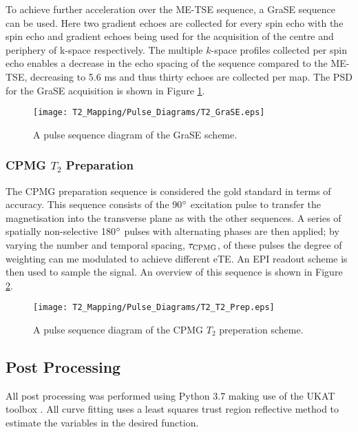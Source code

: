 To achieve further acceleration over the \ac{ME-TSE} sequence, a \ac{GraSE} sequence can be used. Here two gradient echoes are collected for every spin echo with the spin echo and gradient echoes being used for the acquisition of the centre and periphery of k-space respectively. The multiple $k$-space profiles collected per spin echo enables a decrease in the echo spacing of the sequence compared to the \ac{ME-TSE}, decreasing to 5.6 ms and thus thirty echoes are collected per \ttwo map. The \ac{PSD} for the \ac{GraSE} acquisition is shown in Figure \ref{fig:t2_grase_seq}.

\begin{figure}[H]
	\centering
	\texttt{[image: T2\_Mapping/Pulse\_Diagrams/T2\_GraSE.eps]}
	\caption{A pulse sequence diagram of the \ac{GraSE} scheme.}
	\label{fig:t2_grase_seq}	
\end{figure}

\subsubsection{CPMG $T_2$ Preparation}

The \ac{CPMG} \ttwo preparation sequence is considered the gold standard in terms of accuracy. This sequence consists of the 90$\degree$ excitation pulse to transfer the magnetisation into the transverse plane as with the other sequences. A series of spatially non-selective 180$\degree$ pulses with alternating phases are then applied; by varying the number and temporal spacing, $\tau_{\textup{CPMG}}$, of these pulses the degree of \ttwo weighting can me modulated to achieve different \ac{eTE}. An \ac{EPI} readout scheme is then used to sample the signal. An overview of this sequence is shown in Figure \ref{fig:t2_cpmg_t2prep_seq}.

\begin{figure}[H]
	\centering
	\texttt{[image: T2\_Mapping/Pulse\_Diagrams/T2\_T2\_Prep.eps]}
	\caption{A pulse sequence diagram of the \ac{CPMG} $T_2$ preperation scheme.}
	\label{fig:t2_cpmg_t2prep_seq}	
\end{figure}


\subsection{Post Processing}

All post processing was performed using Python 3.7 making use of the \ac{UKAT} toolbox \cite{nery_ukrin_2020}. All curve fitting uses a least squares trust region reflective method to estimate the variables in the desired function.

